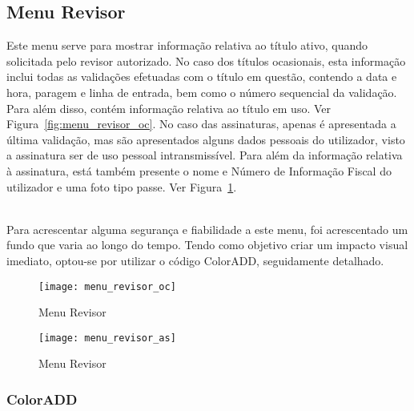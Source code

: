 \subsection{Menu Revisor}

Este menu serve para mostrar informação relativa ao título ativo, quando solicitada pelo revisor autorizado. No caso dos títulos ocasionais, esta informação inclui todas as validações efetuadas com o título em questão, contendo a data e hora, paragem e linha de entrada, bem como o número sequencial da validação. Para além disso, contém informação relativa ao título em uso. Ver Figura~\ref{fig:menu_revisor_oc}. No caso das assinaturas, apenas é apresentada a última validação, mas são apresentados alguns dados pessoais do utilizador, visto a assinatura ser de uso pessoal intransmissível. Para além da informação relativa à assinatura, está também presente o nome e Número de Informação Fiscal do utilizador e uma foto tipo passe. Ver Figura~\ref{fig:menu_revisor_as}.

~\\Para acrescentar alguma segurança e fiabilidade a este menu, foi acrescentado um fundo que varia ao longo do tempo. Tendo como objetivo criar um impacto visual imediato, optou-se por utilizar o código ColorADD, seguidamente detalhado.

\begin{figure}[ht]
\begin{minipage}[b]{0.45\linewidth}
\centering
\texttt{[image: menu\_revisor\_oc]}
    \caption{Menu Revisor}
    \label{fig:menu_revisor_oc}
\end{minipage}
\hspace{0.5cm}
\begin{minipage}[b]{0.45\linewidth}
\centering
    \texttt{[image: menu\_revisor\_as]}
    \caption{Menu Revisor}
    \label{fig:menu_revisor_as}
\end{minipage}
\end{figure}

\subsubsection{ColorADD}

